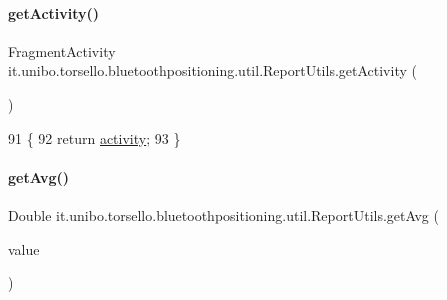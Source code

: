 \paragraph{\texorpdfstring{get\+Activity()}{getActivity()}}
{\footnotesize\ttfamily Fragment\+Activity it.\+unibo.\+torsello.\+bluetoothpositioning.\+util.\+Report\+Utils.\+get\+Activity (\begin{DoxyParamCaption}{ }\end{DoxyParamCaption})}


\begin{DoxyCode}
91                                           \{
92         \textcolor{keywordflow}{return} \hyperlink{classit_1_1unibo_1_1torsello_1_1bluetoothpositioning_1_1util_1_1ReportUtils_ae36eb3321f2d7f96753d7854f5cb6923_ae36eb3321f2d7f96753d7854f5cb6923}{activity};
93     \}
\end{DoxyCode}
\hypertarget{classit_1_1unibo_1_1torsello_1_1bluetoothpositioning_1_1util_1_1ReportUtils_a4efc733750ef3ab7dddb613291bff1c4_a4efc733750ef3ab7dddb613291bff1c4}{}\label{classit_1_1unibo_1_1torsello_1_1bluetoothpositioning_1_1util_1_1ReportUtils_a4efc733750ef3ab7dddb613291bff1c4_a4efc733750ef3ab7dddb613291bff1c4} 
\paragraph{\texorpdfstring{get\+Avg()}{getAvg()}}
{\footnotesize\ttfamily Double it.\+unibo.\+torsello.\+bluetoothpositioning.\+util.\+Report\+Utils.\+get\+Avg (\begin{DoxyParamCaption}\item[{Array\+List$<$ Double $>$}]{value }\end{DoxyParamCaption})\hspace{0.3cm}{\ttfamily [private]}}


